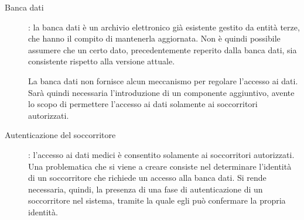 \documentclass[a4paper,12pt]{report}
\begin{document}
\begin{description}
	\item[Banca dati]: la banca dati è un archivio elettronico già esistente gestito da entità terze, che hanno il compito di mantenerla aggiornata. Non è quindi possibile assumere che un certo dato, precedentemente reperito dalla banca dati, sia consistente rispetto alla versione attuale. 
	
	La banca dati non fornisce alcun meccanismo per regolare l'accesso ai dati. Sarà quindi necessaria l'introduzione di un componente aggiuntivo, avente lo scopo di permettere l'accesso ai dati solamente ai soccorritori autorizzati.
	
	\item[Autenticazione del soccorritore]: l'accesso ai dati medici è consentito solamente ai soccorritori autorizzati. Una problematica che si viene a creare consiste nel determinare l'identità di un soccorritore che richiede un accesso alla banca dati. Si rende necessaria, quindi, la presenza di una fase di autenticazione di un soccorritore nel sistema, tramite la quale egli può confermare la propria identità.
	

\end{description}
\end{document}
